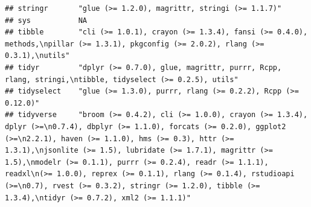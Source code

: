 \documentclass[]{article}
\begin{document}
\begin{verbatim}
## stringr       "glue (>= 1.2.0), magrittr, stringi (>= 1.1.7)"                                                                                                                                                                                                                                                                                                                                                                                                                                       
## sys           NA                                                                                                                                                                                                                                                                                                                                                                                                                                                                                    
## tibble        "cli (>= 1.0.1), crayon (>= 1.3.4), fansi (>= 0.4.0), methods,\npillar (>= 1.3.1), pkgconfig (>= 2.0.2), rlang (>= 0.3.1),\nutils"                                                                                                                                                                                                                                                                                                                                                    
## tidyr         "dplyr (>= 0.7.0), glue, magrittr, purrr, Rcpp, rlang, stringi,\ntibble, tidyselect (>= 0.2.5), utils"                                                                                                                                                                                                                                                                                                                                                                                
## tidyselect    "glue (>= 1.3.0), purrr, rlang (>= 0.2.2), Rcpp (>= 0.12.0)"                                                                                                                                                                                                                                                                                                                                                                                                                          
## tidyverse     "broom (>= 0.4.2), cli (>= 1.0.0), crayon (>= 1.3.4), dplyr (>=\n0.7.4), dbplyr (>= 1.1.0), forcats (>= 0.2.0), ggplot2 (>=\n2.2.1), haven (>= 1.1.0), hms (>= 0.3), httr (>= 1.3.1),\njsonlite (>= 1.5), lubridate (>= 1.7.1), magrittr (>= 1.5),\nmodelr (>= 0.1.1), purrr (>= 0.2.4), readr (>= 1.1.1), readxl\n(>= 1.0.0), reprex (>= 0.1.1), rlang (>= 0.1.4), rstudioapi (>=\n0.7), rvest (>= 0.3.2), stringr (>= 1.2.0), tibble (>= 1.3.4),\ntidyr (>= 0.7.2), xml2 (>= 1.1.1)"

\end{verbatim}
\end{document}
